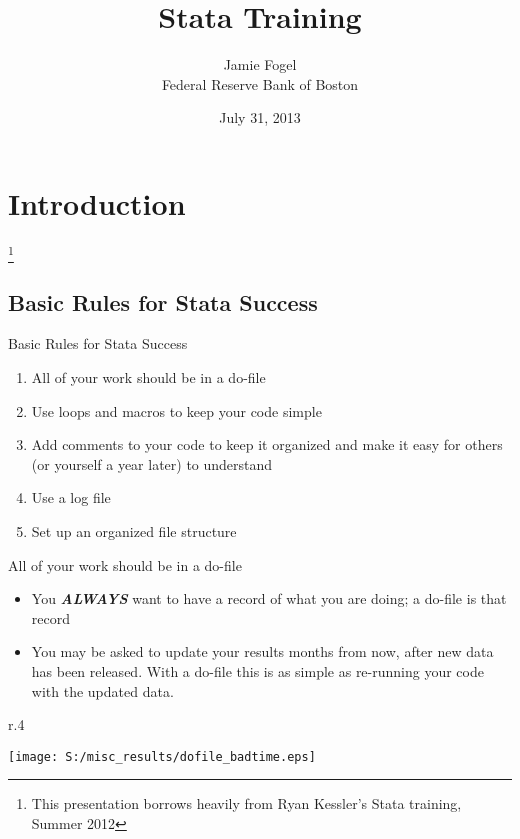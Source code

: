 \documentclass[fleqn, handout, 10pt]{beamer}
\title{\textbf{Stata Training}}
\date[July 2013]{July 31, 2013}
\author[J. Fogel]{Jamie Fogel \\ Federal Reserve Bank of Boston \\ }
\renewcommand{\thefootnote}{\roman{footnote}}
\begin{document}
\section{Introduction}

\begin{frame}[plain]
    \titlepage \let\thefootnote\relax\footnote{This presentation borrows heavily from Ryan Kessler's Stata training, Summer 2012}
\end{frame}

\subsection{Basic Rules for Stata Success}

\begin{frame}{Basic Rules for Stata Success}
    \begin{enumerate}
	\item All of your work should be in a do-file \pause
	\item Use loops and macros to keep your code simple \pause
    \item Add comments to your code to keep it organized and make it easy for others (or yourself a year later) to understand \pause
	\item Use a log file \pause
	\item Set up an organized file structure
    \end{enumerate}
\end{frame}

\begin{frame}{All of your work should be in a do-file}
	\begin{itemize}
	    \item You \textbf{\emph{ALWAYS}} want to have a record of what you are doing; a do-file is that record
	    \item You may be asked to update your results months from now, after new data has been released. With a do-file this is as simple as re-running your code with the updated data.  \pause
	\end{itemize}
    \centering
	    \begin{wrapfigure}{r}{.4\textwidth}
		\begin{center}
		\texttt{[image: S:/misc\_results/dofile\_badtime.eps]}
		\end{center}
	    \end{wrapfigure}
	\clearpage
\end{frame}
\end{document}
